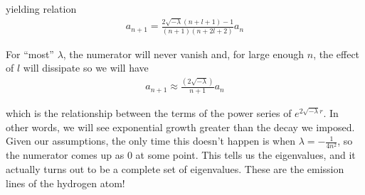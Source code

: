 \documentclass{article}
\begin{document}
	yielding relation
	\begin{align*}
		a_{n+1} = \frac{2\sqrt{-\lambda}(n+l+1)-1}{(n+1)(n+2l+2)} a_{n}
	\end{align*}
	
	For ``most'' $\lambda$, the numerator will never vanish and, for large enough $n$, the effect of $l$ will dissipate so we will have 
	\begin{align*}
		a_{n+1} \approx \frac{(2\sqrt{-\lambda})}{n+1}a_{n}
	\end{align*}
	
	which is the relationship between the terms of the power series of $e^{2\sqrt{-\lambda} r}$. In other words, we will see exponential growth greater than the decay we imposed. Given our assumptions, the only time this doesn't happen is when $\lambda = -\frac{1}{4n^{2}}$, so the numerator comes up as $0$ at some point. This tells us the eigenvalues, and it actually turns out to be a complete set of eigenvalues. These are the emission lines of the hydrogen atom!
	
\end{document}
